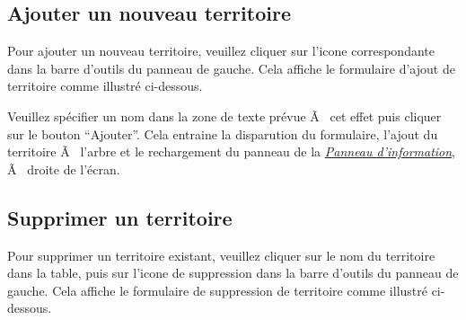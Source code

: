 \documentclass[letterpaper,10pt,french]{sphinxmanual}
\begin{document}
\subsection{Ajouter un nouveau territoire}
\label{territories/territorieslist:ajouter-un-nouveau-territoire}
Pour ajouter un nouveau territoire, veuillez cliquer sur l'icone
correspondante dans la barre d'outils du panneau de gauche. Cela
affiche le formulaire d'ajout de territoire comme illustré ci-dessous.


Veuillez spécifier un nom dans la zone de texte prévue Ã  cet effet
puis cliquer sur le bouton ``Ajouter''. Cela entraine la disparution du
formulaire, l'ajout du territoire Ã  l'arbre et le rechargement du
panneau de la {\hyperref[territories/infopanel::doc]{\emph{\emph{Panneau d'information}}}}, Ã  droite de l'écran.


\subsection{Supprimer un territoire}
\label{territories/territorieslist:supprimer-un-territoire}
Pour supprimer un territoire existant, veuillez cliquer sur le nom du
territoire dans la table, puis sur l'icone de suppression dans la
barre d'outils du panneau de gauche. Cela affiche le formulaire de
suppression de territoire comme illustré ci-dessous.
\end{document}
